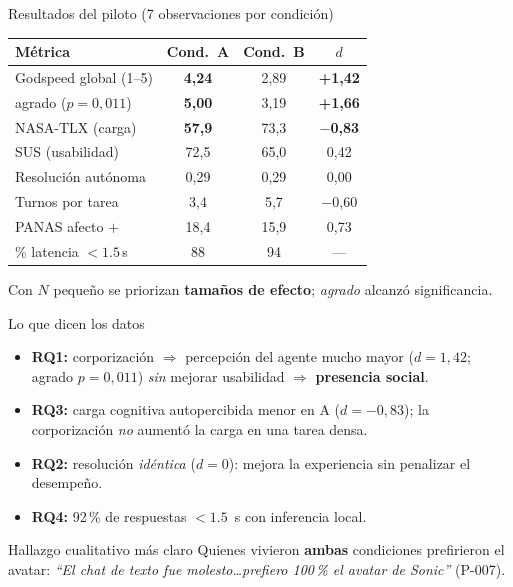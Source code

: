 \documentclass[aspectratio=169]{beamer}
\begin{document}
\begin{frame}{Resultados del piloto (7 observaciones por condición)}
  \centering
  \footnotesize
  \begin{tabular}{@{}lccc@{}}
    \toprule
    \textbf{Métrica} & \textbf{Cond.\ A} & \textbf{Cond.\ B} & \textbf{$d$} \\
    \midrule
    Godspeed global (1--5)        & \textbf{4,24} & 2,89 & \textbf{+1,42} \\
    \quad agrado ($p=0{,}011$)    & \textbf{5,00} & 3,19 & \textbf{+1,66} \\
    NASA-TLX (carga)              & \textbf{57,9} & 73,3 & \textbf{$-$0,83} \\
    SUS (usabilidad)              & 72,5 & 65,0 & 0,42 \\
    Resolución autónoma           & 0,29 & 0,29 & 0,00 \\
    Turnos por tarea              & 3,4 & 5,7 & $-$0,60 \\
    PANAS afecto $+$              & 18,4 & 15,9 & 0,73 \\
    \% latencia $<1.5$\,s         & 88 & 94 & --- \\
    \bottomrule
  \end{tabular}

  \vspace{0.6em}
  \footnotesize Con $N$ pequeño se priorizan \textbf{tamaños de efecto}; \emph{agrado} alcanzó
  significancia.
\end{frame}

\begin{frame}{Lo que dicen los datos}
  \begin{itemize}
    \item \textbf{RQ1:} corporización $\Rightarrow$ percepción del agente \alert{mucho mayor}
          ($d=1{,}42$; agrado $p=0{,}011$) \emph{sin} mejorar usabilidad $\Rightarrow$
          \textbf{presencia social}.
    \item \textbf{RQ3:} carga cognitiva autopercibida \alert{menor} en A ($d=-0{,}83$); la
          corporización \emph{no} aumentó la carga en una tarea densa.
    \item \textbf{RQ2:} resolución \emph{idéntica} ($d=0$): mejora la experiencia sin penalizar el
          desempeño.
    \item \textbf{RQ4:} 92\,\% de respuestas $<1.5$~s con inferencia local. \checkmark
  \end{itemize}
  \begin{block}{Hallazgo cualitativo más claro}
    Quienes vivieron \textbf{ambas} condiciones prefirieron el avatar: \emph{``El chat de texto fue
    molesto\ldots prefiero 100\,\% el avatar de Sonic''} (P-007).
  \end{block}
\end{frame}
\end{document}
